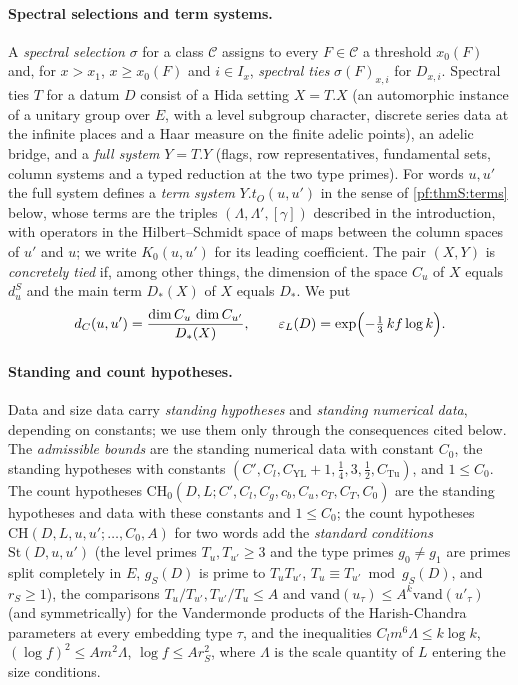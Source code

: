 \paragraph{Spectral selections and term systems.}
A \emph{spectral selection} $\sigma$ for a class $\mathcal C$ assigns to every $F\in\mathcal C$ a threshold $x_0(F)$
and, for $x>x_1$, $x\ge x_0(F)$ and $i\in I_x$, \emph{spectral ties} $\sigma(F)_{x,i}$ for $D_{x,i}$. Spectral ties
$T$ for a datum $D$ consist of a Hida setting $X=T.X$ (an automorphic instance of a unitary group over $E$, with a
level subgroup character, discrete series data at the infinite places and a Haar measure on the finite adelic
points), an adelic bridge, and a \emph{full system} $Y=T.Y$ (flags, row representatives, fundamental sets,
column systems and a typed reduction at the two type primes). For words $u,u'$ the full system defines a
\emph{term system} $Y.t_O(u,u')$ in the sense of \cref{pf:thmS:terms} below, whose terms are the triples
$(\Lambda,\Lambda',[\gamma])$ described in the introduction, with operators in the Hilbert--Schmidt space of maps
between the column spaces of $u'$ and $u$; we write $K_0(u,u')$ for its leading coefficient. The pair $(X,Y)$
is \emph{concretely tied} if, among other things, the dimension of the space $C_u$ of $X$ equals $d^S_u$ and the
main term $D_*(X)$ of $X$ equals $D_*$. We put
\[
d_{C}(u,u')=\frac{\dim C_u\,\dim C_{u'}}{D_*(X)},\qquad \varepsilon_{L}(D)=\exp\Bigl(-\tfrac13\,k f\log k\Bigr).
\]

\paragraph{Standing and count hypotheses.}
Data and size data carry \emph{standing hypotheses} and \emph{standing numerical data}, depending on constants; we use
them only through the consequences cited below. The \emph{admissible bounds} are the standing numerical data with
constant $C_0$, the standing hypotheses with constants $(C',C_l,C_{\mathrm{YL}}+1,\frac14,3,\frac12,C_{\mathrm{Tu}})$, and
$1\le C_0$. The count hypotheses $\mathrm{CH}_0(D,L;C',C_l,C_g,c_b,C_u,c_T,C_T,C_0)$ are the standing hypotheses and data
with these constants and $1\le C_0$; the count hypotheses $\mathrm{CH}(D,L,u,u';\dots,C_0,A)$ for two words add the
\emph{standard conditions} $\mathrm{St}(D,u,u')$ (the level primes $T_u,T_{u'}\ge3$ and the type primes $g_0\ne g_1$ are
primes split completely in $E$, $g_S(D)$ is prime to $T_uT_{u'}$, $T_u\equiv T_{u'}\bmod g_S(D)$, and $r_S\ge1$), the
comparisons $T_u/T_{u'},T_{u'}/T_u\le A$ and $\mathrm{vand}(u_\tau)\le A^k\mathrm{vand}(u'_\tau)$ (and symmetrically) for
the Vandermonde products of the Harish-Chandra parameters at every embedding type $\tau$, and the inequalities
$C_lm^6\Lambda\le k\log k$, $(\log f)^2\le Am^2\Lambda$, $\log f\le Ar_S^2$, where $\Lambda$ is the scale quantity of $L$
entering the size conditions.

